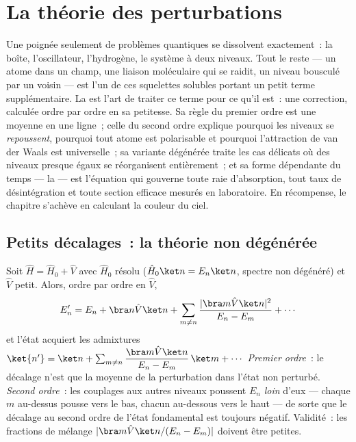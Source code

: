 \chapter{La théorie des perturbations}\label{ch:b3:perturbation-theory}

Une poignée seulement de problèmes quantiques se dissolvent
exactement~: la boîte, l'oscillateur, l'hydrogène, le système à deux
niveaux. Tout le reste --- un atome dans un champ, une liaison
moléculaire qui se raidit, un niveau bousculé par un voisin --- est
l'un de ces squelettes solubles portant un petit terme
supplémentaire. La  est l'art de traiter ce
terme pour ce qu'il est~: une correction, calculée ordre par ordre en
sa petitesse. Sa règle du premier ordre est une moyenne en une ligne~;
celle du second ordre explique pourquoi les niveaux se
\emph{repoussent}, pourquoi tout atome est polarisable et pourquoi
l'attraction de van der Waals est universelle~; sa variante dégénérée
traite les cas délicats où des niveaux presque égaux se réorganisent
entièrement~; et sa forme dépendante du temps --- la  --- est l'équation qui gouverne toute raie d'absorption, tout
taux de désintégration et toute section efficace mesurés en
laboratoire. En récompense, le chapitre s'achève en calculant la
couleur du ciel.

\section{Petits décalages~: la théorie non dégénérée}

\begin{theorem}\label{thm:b3:perturbation-theory:corrections}
Soit $\hat H = \hat H_0 + \hat V$ avec $\hat H_0$ résolu
($\hat H_0\ket n = E_n\ket n$, spectre non dégénéré) et $\hat V$
petit. Alors, ordre par ordre en $\hat V$,
\[
E_n' = E_n + \bra n\hat V\ket n
 + \sum_{m \neq n}\frac{|\bra m\hat V\ket n|^2}{E_n - E_m}
 + \cdots
\]
et l'état acquiert les admixtures $\ket{n'} = \ket n + \sum_{m\neq
n}\dfrac{\bra m\hat V\ket n}{E_n - E_m}\,\ket m + \cdots$
\emph{Premier ordre}~: le décalage n'est que la moyenne de la
perturbation dans l'état non perturbé. \emph{Second ordre}~: les
couplages aux autres niveaux poussent $E_n$ \emph{loin} d'eux ---
chaque $m$ au-dessus pousse vers le bas, chacun au-dessous vers le
haut --- de sorte que le décalage au second ordre de l'état
fondamental est toujours négatif. Validité~: les fractions de mélange
$|\bra m\hat V\ket n/(E_n - E_m)|$ doivent être petites.
\end{theorem}

